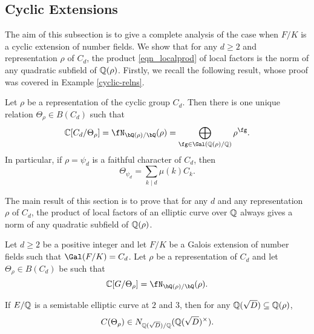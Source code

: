 \subsection{Cyclic Extensions}\label{sec_cyclic}

The aim of this subsection is to give a complete analysis of the case when $F/K$ is a cyclic extension of number fields. We show that for any $d\geq 2$ and representation $\rho$ of $C_d$, the product \eqref{eqn_localprod} of local factors is the norm of any quadratic subfield of $\mathbb{Q}(\rho)$. 
Firstly, we recall the following result, whose proof was covered in Example \ref{cyclic-relns}.

\begin{lemma}\label{lem_relation}
    Let $\rho$ be a representation of the cyclic group $C_d$. Then there is one unique relation $\Theta_\rho\in B(C_d)$ such that 
    $$\CC[C_d/\Theta_{\rho}]=\repnorm{\rho}=\bigoplus_{\fg\in\Gal(\QQ(\rho)/\QQ)}\rho^{\fg}.$$
    In particular, if $\rho=\psi_d$ is a faithful character of $C_d$, then
    $$\Theta_{\psi_d}=\sum_{k\mid d}\mu(k)C_k.$$
\end{lemma}




The main result of this section is to prove that for any $d$ and any representation $\rho$ of $C_d$, the product of local factors of an elliptic curve over $\mathbb{Q}$ always gives a norm of any quadratic subfield of $\mathbb{Q}(\rho)$.

\begin{thm}\label{thm_consistent_cyclic}
    Let $d\geq2$ be a positive integer and let $F/K$ be a Galois extension of number fields such that $\Gal(F/K)=C_d$. Let $\rho$ be a representation of $C_d$ and let $\Theta_\rho\in B(C_d)$ be such that
    $$\CC[G/\Theta_\rho]=\repnorm{\rho}.$$

    If $E/\mathbb{Q}$ is a semistable elliptic curve at $2$ and $3$, then for any $\mathbb{Q}(\sqrt{D})\subseteq\mathbb{Q}(\rho)$,
    $$C(\Theta_\rho)\in N_{\mathbb{Q}(\sqrt{D})/\mathbb{Q}}(\mathbb{Q}(\sqrt{D})^{\times}).$$
\end{thm}

